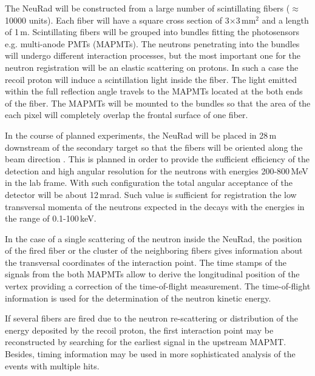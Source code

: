 \documentclass{webofc}
\begin{document}
The NeuRad will be constructed from a large number of scintillating fibers ($\approx$10000 units). Each fiber will have a square cross section of 3$\times$3\,mm$^2$ and a length of 1\,m. Scintillating fibers will be grouped into bundles fitting the photosensors e.g. multi-anode PMTs (MAPMTs).
The neutrons penetrating into the bundles will undergo different interaction processes, but the most important one for the neutron registration will be an elastic scattering on protons. In such a case the recoil proton will induce a scintillation light inside the fiber. 
The light emitted within the full reflection angle travels to the MAPMTs located at the both ends of the fiber.
The MAPMTs will be mounted to the bundles so that the area of the each pixel will completely overlap the frontal surface of one fiber.


In the course of planned experiments, the NeuRad will be placed in 28\,m downstream of the secondary target so that the fibers will be oriented along the beam direction \cite{report}.
This is planned in order to provide the sufficient efficiency of the detection and high angular resolution for the neutrons with energies 200-800\,MeV in the lab frame.
With such configuration the total angular acceptance of the detector will be about 12\,mrad.
Such value is sufficient for registration the low transversal momenta of the neutrons expected in the decays with the energies in the range of 0.1-100\,keV.

In the case of a single scattering of the neutron inside the NeuRad, the position of the fired fiber or the cluster of the neighboring fibers gives information about the transversal coordinates of the interaction point. The time stamps of the signals from the both MAPMTs allow to derive the longitudinal position of the vertex providing a correction of the time-of-flight measurement. The time-of-flight information is used for the determination of the neutron kinetic energy. 

If several fibers are fired due to the neutron re-scattering or distribution of the energy deposited by the recoil proton, the first interaction point may be reconstructed by searching for the earliest signal in the upstream MAPMT. Besides, timing information may be used in more sophisticated analysis of the events with multiple hits.
\end{document}
